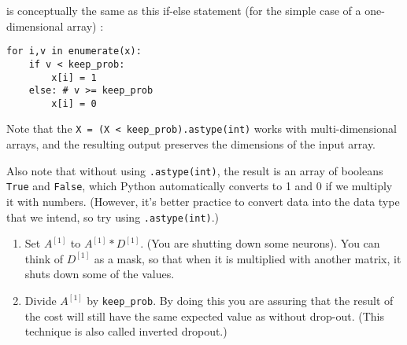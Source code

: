\documentclass[11pt]{article}
\providecommand{\tightlist}{%
      \setlength{\itemsep}{0pt}\setlength{\parskip}{0pt}}
\begin{document}
is conceptually the same as this if-else statement (for the simple case
of a one-dimensional array) :

\begin{verbatim}
for i,v in enumerate(x):
    if v < keep_prob:
        x[i] = 1
    else: # v >= keep_prob
        x[i] = 0
\end{verbatim}

Note that the \texttt{X\ =\ (X\ \textless{}\ keep\_prob).astype(int)}
works with multi-dimensional arrays, and the resulting output preserves
the dimensions of the input array.

Also note that without using \texttt{.astype(int)}, the result is an
array of booleans \texttt{True} and \texttt{False}, which Python
automatically converts to 1 and 0 if we multiply it with numbers.
(However, it's better practice to convert data into the data type that
we intend, so try using \texttt{.astype(int)}.)

\begin{enumerate}
\def\labelenumi{\arabic{enumi}.}
\setcounter{enumi}{2}
\tightlist
\item
  Set \(A^{[1]}\) to \(A^{[1]} * D^{[1]}\). (You are shutting down some
  neurons). You can think of \(D^{[1]}\) as a mask, so that when it is
  multiplied with another matrix, it shuts down some of the values.
\item
  Divide \(A^{[1]}\) by \texttt{keep\_prob}. By doing this you are
  assuring that the result of the cost will still have the same expected
  value as without drop-out. (This technique is also called inverted
  dropout.)
\end{enumerate}
\end{document}
